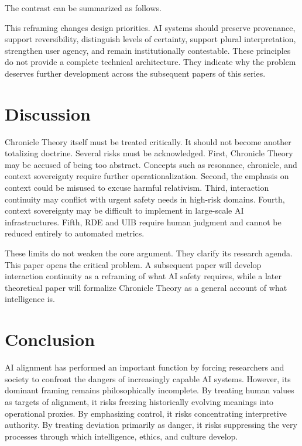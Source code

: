 \documentclass[11pt,a4paper]{article}
\begin{document}
The contrast can be summarized as follows.



This reframing changes design priorities. AI systems should preserve provenance, support reversibility, distinguish levels of certainty, support plural interpretation, strengthen user agency, and remain institutionally contestable. These principles do not provide a complete technical architecture. They indicate why the problem deserves further development across the subsequent papers of this series.

\section{Discussion}

Chronicle Theory itself must be treated critically. It should not become another totalizing doctrine. Several risks must be acknowledged. First, Chronicle Theory may be accused of being too abstract. Concepts such as resonance, chronicle, and context sovereignty require further operationalization. Second, the emphasis on context could be misused to excuse harmful relativism. Third, interaction continuity may conflict with urgent safety needs in high-risk domains. Fourth, context sovereignty may be difficult to implement in large-scale AI infrastructures. Fifth, RDE and UIB require human judgment and cannot be reduced entirely to automated metrics.

These limits do not weaken the core argument. They clarify its research agenda. This paper opens the critical problem. A subsequent paper will develop interaction continuity as a reframing of what AI safety requires, while a later theoretical paper will formalize Chronicle Theory as a general account of what intelligence is.

\section{Conclusion}

AI alignment has performed an important function by forcing researchers and society to confront the dangers of increasingly capable AI systems. However, its dominant framing remains philosophically incomplete. By treating human values as targets of alignment, it risks freezing historically evolving meanings into operational proxies. By emphasizing control, it risks concentrating interpretive authority. By treating deviation primarily as danger, it risks suppressing the very processes through which intelligence, ethics, and culture develop.
\end{document}
